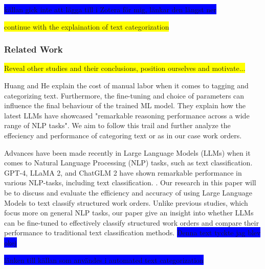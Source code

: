 \documentclass{article}
\begin{document}
\colorbox{blue}{källan gick inte att lägga till i Zotera för mig, länkar den längst ner}
\bigskip

\colorbox{yellow}{continue with the explaination of text categorization}

\subsubsection{Related Work}
\colorbox{yellow}{Reveal other studies and their conclusions, position ourselves and motivate...}






Huang and He \cite{huang2024} explain the cost of manual labor when it comes to tagging and categorizing text.
Furthermore, the fine-tuning and choice of parameters can influence the final behaviour of the trained
ML model.
They explain how the latest LLMs have showcased "remarkable reasoning performance across a wide range of
NLP tasks".
We aim to follow this trail and further analyze the effeciency and performance of categoring text or as in our
case work orders.
\bigskip

Advances have been made recently in Large Language Models (LLMs) when it comes to Natural Language Processing (NLP) tasks,
such as text classification.
GPT-4, LLaMA 2, and ChatGLM 2 have shown remarkable performance in various NLP-tasks, including text classification.
\cite{zhang2024}.
Our research in this paper will be to discuss and evaluate the efficiency and accuracy of using Large Language Models
to text classify structured work orders. Unlike previous studies, which focus more on general NLP tasks,
our paper give an insight into whether LLMs can be fine-tuned to effectively classify structured work orders and compare their
performance to traditional text classification methods.
\colorbox{blue}{Denna text tyckte jag blev okej}




\colorbox{blue}{länken till källan som användes i automated text categorization}

\end{document}
